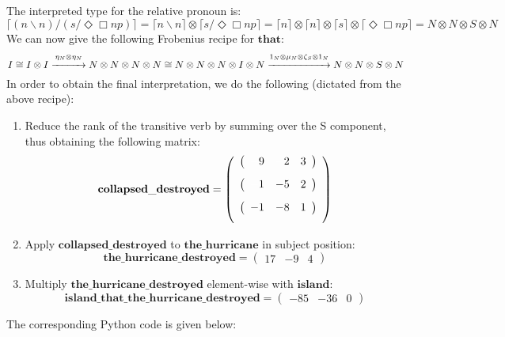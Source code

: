 \documentclass[]{article}
\newcommand{\Wv}[1]{\mathbf{#1}}
\newcommand{\bs}{\backslash}
\newcommand{\F}[1]{\lceil #1 \rceil}
\begin{document}
\subsection{}
The interpreted type for the relative pronoun is:
\[ \F{(n\bs n)/(s/\Diamond\Box np)} = \F{n\bs n} \otimes \F{s/\Diamond\Box np} = 
\F{n} \otimes \F{n} \otimes \F{s} \otimes \F{\Diamond\Box np} =
N \otimes N \otimes S \otimes N \]
We can now give the following Frobenius recipe for $\Wv{that}$:
\[ I \cong I \otimes I \overset{\eta_N \otimes \eta_N}{\xrightarrow{\hspace*{1cm}}} N \otimes N \otimes N \otimes N \cong N \otimes N \otimes N \otimes I \otimes N \overset{1_N \otimes \mu_N \otimes \zeta_S \otimes 1_N}{\xrightarrow{\hspace*{2cm}}} N \otimes N \otimes S \otimes N \] 
In order to obtain the final interpretation, we do the following (dictated from the above recipe):
\begin{enumerate}
\item Reduce the rank of the transitive verb by summing over the S component, thus obtaining the following matrix:
\[
\Wv{collapsed\_destroyed} =
\left(\begin{array}{ccc}
\left(\begin{array}{rrr}\textcolor{white}{-}9 & \textcolor{white}{-}2 & 3 \end{array}\right)\\[2ex]
\left(\begin{array}{rrr}\textcolor{white}{-}1 & -5 & 2 \end{array}\right)\\[2ex]
\left(\begin{array}{rrr}-1 & -8 & 1 \end{array}\right)\\[2ex]
\end{array}
\right)
\]
\item Apply $\Wv{collapsed\_destroyed}$ to $\Wv{the\_hurricane}$ in subject position:
\[
\Wv{the\_hurricane\_destroyed} =
\left(\begin{array}{ccc} 17 & -9 & 4 \end{array}\right)
\]
\item Multiply $\Wv{the\_hurricane\_destroyed}$ element-wise with $\Wv{island}$:
\[
\Wv{island\_that\_the\_hurricane\_destroyed} =
\left(\begin{array}{ccc} -85 & -36 & 0 \end{array}\right)
\]
\end{enumerate}
The corresponding Python code is given below:
\end{document}
